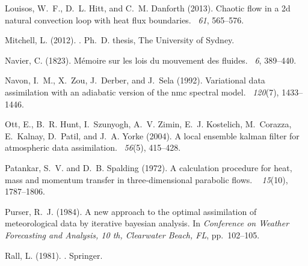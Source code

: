 \documentclass[12pt]{report}
\begin{document}
\begin{thebibliography}{}
Louisos, W.~F., D.~L. Hitt, and C.~M. Danforth (2013).
\newblock Chaotic flow in a 2d natural convection loop with heat flux
  boundaries.
~{\em 61},
  565--576.

Mitchell, L. (2012).
.
\newblock Ph.\ D. thesis, The University of Sydney.

Navier, C. (1823).
\newblock M{\'e}moire sur les lois du mouvement des fluides.
~{\em 6}, 389--440.

Navon, I.~M., X.~Zou, J.~Derber, and J.~Sela (1992).
\newblock Variational data assimilation with an adiabatic version of the nmc
  spectral model.
~{\em 120\/}(7), 1433--1446.

Ott, E., B.~R. Hunt, I.~Szunyogh, A.~V. Zimin, E.~J. Kostelich, M.~Corazza,
  E.~Kalnay, D.~Patil, and J.~A. Yorke (2004).
\newblock A local ensemble kalman filter for atmospheric data assimilation.
~{\em 56\/}(5), 415--428.

Patankar, S.~V. and D.~B. Spalding (1972).
\newblock A calculation procedure for heat, mass and momentum transfer in
  three-dimensional parabolic flows.
~{\em
  15\/}(10), 1787--1806.

Purser, R.~J. (1984).
\newblock A new approach to the optimal assimilation of meteorological data by
  iterative bayesian analysis.
\newblock In {\em Conference on Weather Forecasting and Analysis, 10 th,
  Clearwater Beach, FL}, pp.\  102--105.

Rall, L. (1981).
.
\newblock Springer.


\end{thebibliography}
\end{document}
